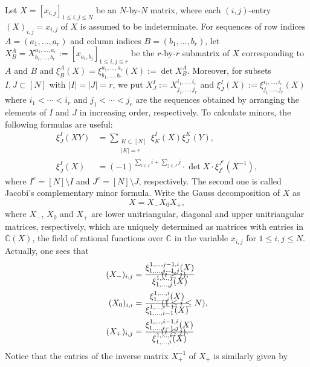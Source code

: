 \documentclass[12pt]{amsart}%
\theoremstyle{definition}
\begin{document}
Let $X=[x_{i,j}]_{1\le i,j\le N}$ be an $N$-by-$N$ matrix, where each $(i,j)$-entry $(X)_{i,j}=x_{i,j}$ of $X$ is assumed to be indeterminate.
For sequences of row indices $A=(a_1,\ldots,a_r)$ and column indices $B=(b_1,\ldots,b_r)$, 
let $X^{A}_{B}=X^{a_1,\ldots,a_r}_{b_1,\ldots,b_r}:=[x_{a_i,b_j}]_{1\le i,j\le r}$
be the $r$-by-$r$ submatrix of $X$ 
corresponding to $A$ and $B$
and $\xi^{A}_{B}(X)=\xi^{a_1,\ldots,a_r}_{b_1,\ldots,b_r}(X):=\det X^{A}_{B}$.
Moreover, for subsets $I,J\subset [N]$ with $|I|=|J|=r$, 
we put $X^{I}_J:=X^{i_1,\ldots,i_r}_{j_1,\ldots,j_r}$
and $\xi^{I}_{J}(X):=\xi^{i_1,\ldots,i_r}_{j_1,\ldots,j_r}(X)$
where $i_1<\cdots <i_r$ and $j_1<\cdots<j_r$ are the sequences obtained by arranging the elements of $I$ and $J$ in increasing order, respectively.
To calculate minors, the following formulas are useful:
\begin{align}
\label{for:xi formula}
 \xi^{I}_{J}(XY)
&=\sum_{\substack{K\subset [N] \\ |K|=r}}\xi^{I}_{K}(X)\xi^{K}_{J}(Y),\\
\label{for:Jacobi complement}
 \xi^{I}_{J}(X)
&=(-1)^{\sum_{i\in I} i+\sum_{j\in J} j}\cdot \det X\cdot \xi^{J^c}_{I^c}(X^{-1}),
\end{align}
where $I^c=[N]\setminus I$ and $J^c=[N]\setminus J$, respectively.
The second one is called Jacobi's complementary minor formula.
Write the Gauss decomposition of $X$ as 
\[
 X=X_{-}X_{0}X_{+},
\]
where $X_{-}$, $X_{0}$ and $X_{+}$ are lower unitriangular,
diagonal and upper unitriangular matrices, respectively,
which are uniquely determined as matrices with entries in 
$\mathbb{C}(X)$, the field of rational functions over $\mathbb{C}$ in the variable $x_{i,j}$ for $1\le i,j\le N$. 
Actually, one sees that 
\begin{align}
\label{for:X-}
 (X_{-})_{i,j} 
&=\frac{\xi^{1,\ldots,j-1,i}_{1,\ldots,j-1,j}(X)}{\xi^{1,\ldots,j}_{1,\ldots,j}(X)} & & \hspace{-50pt} (i\ge j),\\
\label{for:X0}
(X_{0})_{i,i} 
&=\frac{\xi^{1,\ldots,i}_{1,\ldots,i}(X)}{\xi^{1,\ldots,i-1}_{1,\ldots,i-1}(X)} 
& & \hspace{-50pt} (1\le i\le N),\\
\label{for:X+}
(X_{+})_{i,j} 
&=\frac{\xi^{1,\ldots,i-1,i}_{1,\ldots,i-1,j}(X)}{\xi^{1,\ldots,i}_{1,\ldots,i}(X)} & & \hspace{-50pt} (i\le j).
\end{align}
Notice that the entries of the inverse matrix $X^{-1}_{+}$ of $X_{+}$ is similarly given by 
\end{document}
